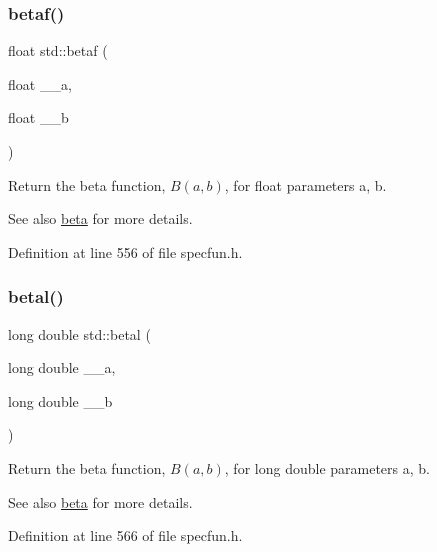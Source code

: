 \subsubsection{\texorpdfstring{betaf()}{betaf()}}
{\footnotesize\ttfamily float std\+::betaf (\begin{DoxyParamCaption}\item[{float}]{\+\_\+\+\_\+a,  }\item[{float}]{\+\_\+\+\_\+b }\end{DoxyParamCaption})\hspace{0.3cm}{\ttfamily [inline]}}

Return the beta function, $ B(a,b) $, for {\ttfamily float} parameters {\ttfamily a}, {\ttfamily b}.

\begin{DoxySeeAlso}{See also}
\hyperlink{group__mathsf__std_gacd36403ae64b89840b1504f97024dcee}{beta} for more details. 
\end{DoxySeeAlso}


Definition at line 556 of file specfun.\+h.

\mbox{\label{group__mathsf__std_ga8caca1cef099f41a88111209c36ce06c}} 
\subsubsection{\texorpdfstring{betal()}{betal()}}
{\footnotesize\ttfamily long double std\+::betal (\begin{DoxyParamCaption}\item[{long double}]{\+\_\+\+\_\+a,  }\item[{long double}]{\+\_\+\+\_\+b }\end{DoxyParamCaption})\hspace{0.3cm}{\ttfamily [inline]}}

Return the beta function, $B(a,b)$, for long double parameters {\ttfamily a}, {\ttfamily b}.

\begin{DoxySeeAlso}{See also}
\hyperlink{group__mathsf__std_gacd36403ae64b89840b1504f97024dcee}{beta} for more details. 
\end{DoxySeeAlso}


Definition at line 566 of file specfun.\+h.

